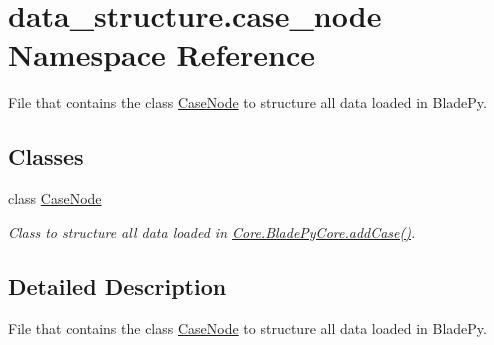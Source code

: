 \hypertarget{a00053}{}\section{data\+\_\+structure.\+case\+\_\+node Namespace Reference}
\label{a00053}


File that contains the class \hyperlink{a00086}{Case\+Node} to structure all data loaded in Blade\+Py.  


\subsection*{Classes}
\begin{DoxyCompactItemize}
\item 
class \hyperlink{a00086}{Case\+Node}
\begin{DoxyCompactList}\small\item\em Class to structure all data loaded in \hyperlink{a00078_a1a62f9b5b8f5929bdb6f0a8c27049d9e}{Core.\+Blade\+Py\+Core.\+add\+Case()}. \end{DoxyCompactList}\end{DoxyCompactItemize}


\subsection{Detailed Description}
File that contains the class \hyperlink{a00086}{Case\+Node} to structure all data loaded in Blade\+Py. 